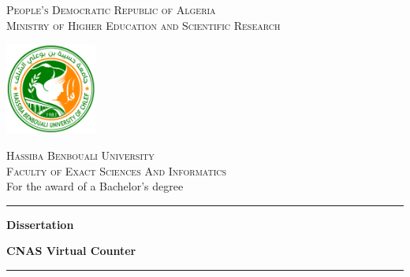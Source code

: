 \documentclass[12pt]{report}
\begin{document}
\begin{titlepage}
    \centering
    \textsc{\Large People's Democratic Republic of Algeria}\\[0.2cm]  %
    \textsc{\Large Ministry of Higher Education and Scientific Research}\\[0.8cm]  %
    
    \vspace{0.5cm}
    
    \includegraphics[width=3cm]{university-logo.png}
    
    \vspace{0.5cm}
    
    \textsc{\LARGE Hassiba Benbouali University}\\[0.5cm]
	\textsc{\LARGE Faculty of Exact Sciences And Informatics}\\[1cm]
    {\large For the award of a Bachelor's degree}\\[0.5cm]
    \rule{\linewidth}{1pt} %
    
    \vspace{0.5cm}
    
    \textbf{\LARGE Dissertation}
    
    \vspace{0.5cm}
    
    \textbf{\huge CNAS Virtual Counter}
    
    \vspace{0.5cm}
    
    \rule{\linewidth}{1pt} %

    \vspace{1.5cm}


\end{titlepage}
\end{document}
